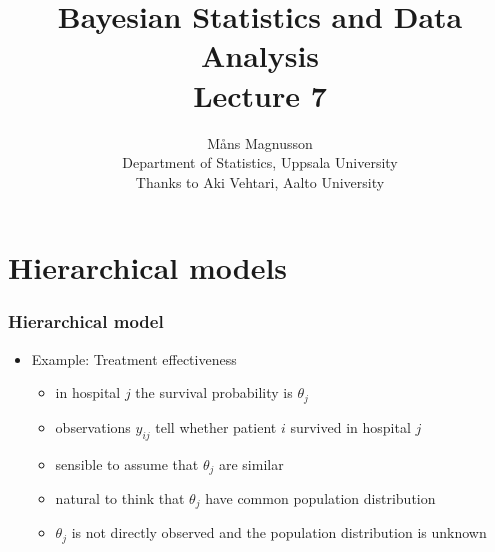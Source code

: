 \documentclass[10pt]{beamer}
\title[]{{\color{black}Bayesian Statistics and Data Analysis \\ Lecture 7}}
\author[]{M{\aa}ns Magnusson \\ Department of Statistics, Uppsala University \\ Thanks to Aki Vehtari, Aalto University}
\date{}
\begin{document}
\frame{\titlepage
}


\section{Hierarchical models}
\frame{\sectionpage}

\begin{frame}

\frametitle{Hierarchical model}

  \begin{itemize}
  \item Example: Treatment effectiveness
    \begin{itemize}
    \item in hospital $j$ the survival probability is $\theta_j$
    \item observations $y_{ij}$ tell whether patient $i$ survived in
      hospital $j$
        \begin{xy}
        \end{xy}
        \pause
      \item sensible to assume that $\theta_j$ are similar
        \begin{xy}
        \end{xy}
      \item natural to think that $\theta_j$ have common population distribution
      \item $\theta_j$ is not directly observed and the population distribution is unknown
    \end{itemize}
  \end{itemize}
\end{frame}
\end{document}
